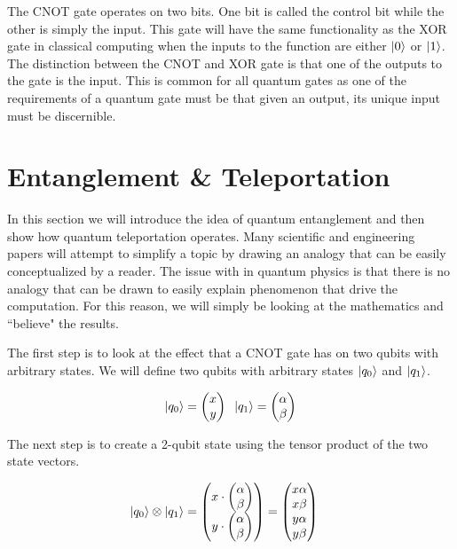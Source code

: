 \documentclass[conference]{IEEEtran}
\begin{document}
The CNOT gate operates on two bits. One bit is called the control bit while the other is simply the input. This gate will have the same functionality as the XOR gate in classical computing when the inputs to the function are either $\ket{0}$ or $\ket{1}$. The distinction between the CNOT and XOR gate is that one of the outputs to the gate is the input. This is common for all quantum gates as one of the requirements of a quantum gate must be that given an output, its unique input must be discernible.

\section{Entanglement \& Teleportation}

In this section we will introduce the idea of quantum entanglement and then show how quantum teleportation operates. Many scientific and engineering papers will attempt to simplify a topic by drawing an analogy that can be easily conceptualized by a reader. The issue with in quantum physics is that there is no analogy that can be drawn to easily explain phenomenon that drive the computation. For this reason, we will simply be looking at the mathematics and ``believe" the results.

The first step is to look at the effect that a CNOT gate has on two qubits with arbitrary states. We will define two qubits with arbitrary states $\ket{q_0}$ and $\ket{q_1}$.

\begin{align*}
\ket{q_0} = \begin{pmatrix}x\\y\end{pmatrix}\;\;
\ket{q_1} = \begin{pmatrix}\alpha\\\beta\end{pmatrix}
\end{align*}

The next step is to create a 2-qubit state using the tensor product of the two state vectors.

\begin{align*}
\ket{q_0} \otimes \ket{q_1} &= \begin{pmatrix}
x \cdot \begin{pmatrix}\alpha\\\beta\end{pmatrix}\\
y \cdot \begin{pmatrix}\alpha\\\beta\end{pmatrix}
\end{pmatrix}
= \begin{pmatrix}x\alpha\\x\beta\\y\alpha\\y\beta\end{pmatrix}
\end{align*}
\end{document}
